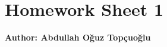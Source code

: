 \documentclass{article}
\begin{document}
\section*{\huge Homework Sheet 1}
\begin{flushright}
   \textbf{Author: Abdullah Oğuz Topçuoğlu}
\end{flushright}

\end{document}
